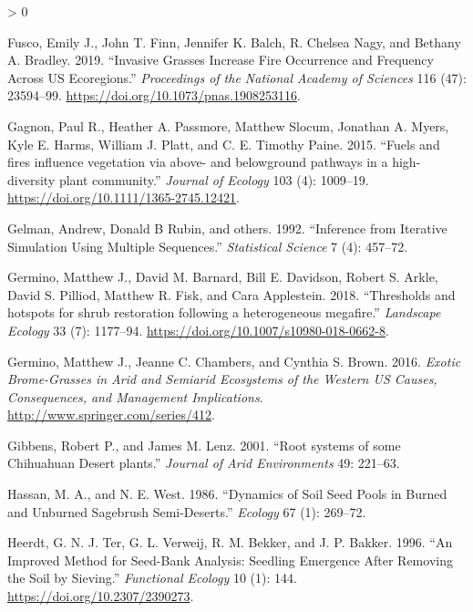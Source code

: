\documentclass[
  12pt,
]{article}
\newlength{\cslhangindent}
\newenvironment{CSLReferences}[2] %
 {%
  \setlength{\parindent}{0pt}
  \ifodd #1 \everypar{\setlength{\hangindent}{\cslhangindent}}\ignorespaces\fi
  \ifnum #2 > 0
  \setlength{\parskip}{#2\baselineskip}
  \fi
 }%
 {}
\begin{document}
\begin{CSLReferences}{1}{0}
\leavevmode\hypertarget{ref-Fusco2019}{}%
Fusco, Emily J., John T. Finn, Jennifer K. Balch, R. Chelsea Nagy, and
Bethany A. Bradley. 2019. {``Invasive Grasses Increase Fire Occurrence
and Frequency Across US Ecoregions.''} \emph{Proceedings of the National
Academy of Sciences} 116 (47): 23594--99.
\url{https://doi.org/10.1073/pnas.1908253116}.

\leavevmode\hypertarget{ref-Gagnon2015}{}%
Gagnon, Paul R., Heather A. Passmore, Matthew Slocum, Jonathan A. Myers,
Kyle E. Harms, William J. Platt, and C. E. Timothy Paine. 2015.
{``{Fuels and fires influence vegetation via above- and belowground
pathways in a high-diversity plant community}.''} \emph{Journal of
Ecology} 103 (4): 1009--19.
\url{https://doi.org/10.1111/1365-2745.12421}.

\leavevmode\hypertarget{ref-Gelman1992}{}%
Gelman, Andrew, Donald B Rubin, and others. 1992. {``Inference from
Iterative Simulation Using Multiple Sequences.''} \emph{Statistical
Science} 7 (4): 457--72.

\leavevmode\hypertarget{ref-Germino2018}{}%
Germino, Matthew J., David M. Barnard, Bill E. Davidson, Robert S.
Arkle, David S. Pilliod, Matthew R. Fisk, and Cara Applestein. 2018.
{``{Thresholds and hotspots for shrub restoration following a
heterogeneous megafire}.''} \emph{Landscape Ecology} 33 (7): 1177--94.
\url{https://doi.org/10.1007/s10980-018-0662-8}.

\leavevmode\hypertarget{ref-Germino2016}{}%
Germino, Matthew J., Jeanne C. Chambers, and Cynthia S. Brown. 2016.
\emph{{Exotic Brome-Grasses in Arid and Semiarid Ecosystems of the
Western US Causes, Consequences, and Management Implications}}.
\url{http://www.springer.com/series/412}.

\leavevmode\hypertarget{ref-Gibbens2001}{}%
Gibbens, Robert P., and James M. Lenz. 2001. {``{Root systems of some
Chihuahuan Desert plants}.''} \emph{Journal of Arid Environments} 49:
221--63.

\leavevmode\hypertarget{ref-Hassan1986}{}%
Hassan, M. A., and N. E. West. 1986. {``{Dynamics of Soil Seed Pools in
Burned and Unburned Sagebrush Semi-Deserts}.''} \emph{Ecology} 67 (1):
269--72.

\leavevmode\hypertarget{ref-Heerdt1996}{}%
Heerdt, G. N. J. Ter, G. L. Verweij, R. M. Bekker, and J. P. Bakker.
1996. {``{An Improved Method for Seed-Bank Analysis: Seedling Emergence
After Removing the Soil by Sieving}.''} \emph{Functional Ecology} 10
(1): 144. \url{https://doi.org/10.2307/2390273}.


\end{CSLReferences}
\end{document}
